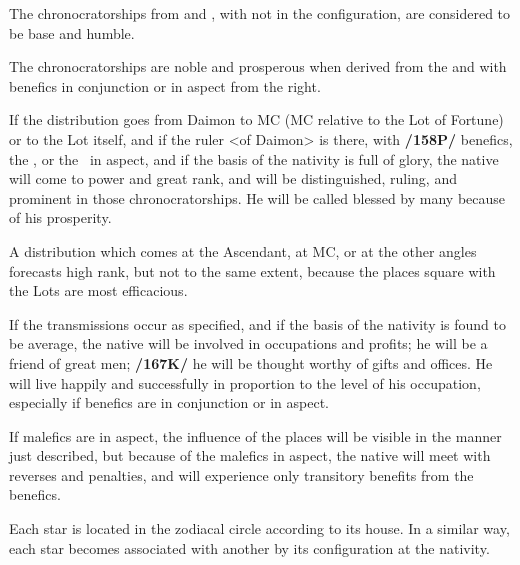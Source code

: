 The chronocratorships from \Saturn\xspace and \Mars, with \Jupiter\xspace not in the configuration, are considered to be base and humble. 

 
The chronocratorships are noble and prosperous when derived from the \Sun\xspace and \Moon\xspace with benefics in
conjunction or in aspect from the right.

If the distribution goes from Daimon to MC (MC relative to the Lot of Fortune) or to the Lot itself, and if the ruler <of Daimon> is there, with \textbf{/158P/} benefics, the \Sun, or the \Moon\, in aspect, and if the basis of the nativity is full of glory, the native will come to power and great rank, and will be distinguished, ruling, and prominent in those chronocratorships. He will be called blessed by many because of his prosperity. 

A distribution which comes at the Ascendant, at MC, or at the other angles forecasts high rank, but not to the same extent, because the places square with the Lots are most efficacious.

If the transmissions occur as specified, and if the basis of the nativity is found to be average, the native will be involved in occupations and profits; he will be a friend of great men; \textbf{/167K/} he will be thought worthy of gifts and offices. He will live happily and successfully in proportion to the level of his occupation, especially if benefics are in conjunction or in aspect. 

If malefics are in aspect, the influence of the places will be visible in the manner just described, but because of the malefics in aspect, the native will meet with reverses and penalties, and will experience only transitory benefits from the benefics.

Each star is located in the zodiacal circle according to its house. In a similar way, each star becomes associated with another by its configuration at the nativity.

\newpage